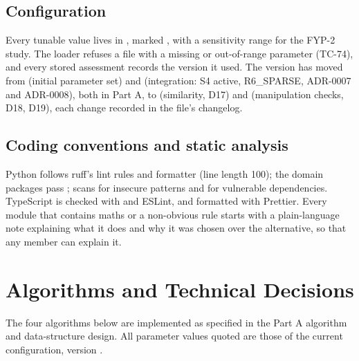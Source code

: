 \subsection{Configuration}\label{sec:configuration}
Every tunable value lives in , marked , with a sensitivity range for the FYP-2 study. The loader refuses a file with a missing or out-of-range parameter (TC-74), and every stored assessment records the version it used. The version has moved from  (initial parameter set) and  (integration: S4 active, R6\_SPARSE, ADR-0007 and ADR-0008), both in Part A, to  (similarity, D17) and  (manipulation checks, D18, D19), each change recorded in the file's changelog.

\subsection{Coding conventions and static analysis}\label{sec:coding-conventions-static-analysis}
Python follows ruff's lint rules and formatter (line length 100); the domain packages pass ;  scans for insecure patterns and  for vulnerable dependencies. TypeScript is checked with  and ESLint, and formatted with Prettier. Every module that contains maths or a non-obvious rule starts with a plain-language note explaining what it does and why it was chosen over the alternative, so that any member can explain it.

\section{Algorithms and Technical Decisions}\label{sec:algorithms-technical-decisions}
The four algorithms below are implemented as specified in the Part A algorithm and data-structure design. All parameter values quoted are those of the current configuration, version .

